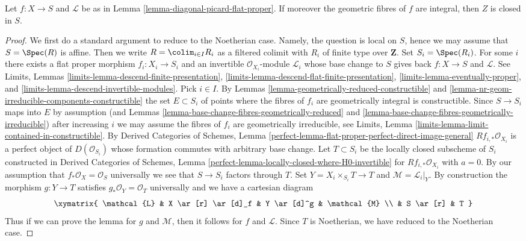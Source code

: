 \begin{lemma}
\label{lemma-get-a-closed}
Let $f : X \to S$ and $\mathcal{L}$ be as in
Lemma \ref{lemma-diagonal-picard-flat-proper}.
If moreover the geometric fibres of $f$ are
integral, then $Z$ is closed in $S$.
\end{lemma}

\begin{proof}
We first do a standard argument to reduce to the Noetherian case.
Namely, the question is local on $S$, hence we may assume that
$S = \Spec(R)$ is affine. Then we write $R = \colim_{i \in I} R_i$
as a filtered colimit with
$R_i$ of finite type over $\mathbf{Z}$. Set $S_i = \Spec(R_i)$.
For some $i$ there exists a flat proper morphism $f_i : X_i \to S_i$
and an invertible $\mathcal{O}_{X_i}$-module $\mathcal{L}_i$
whose base change to $S$ gives back $f : X \to S$ and $\mathcal{L}$.
See Limits, Lemmas \ref{limits-lemma-descend-finite-presentation},
\ref{limits-lemma-descend-flat-finite-presentation},
\ref{limits-lemma-eventually-proper}, and
\ref{limits-lemma-descend-invertible-modules}.
Pick $i \in I$.
By Lemmas \ref{lemma-geometrically-reduced-constructible} and
\ref{lemma-nr-geom-irreducible-components-constructible}
the set $E \subset S_i$ of points where the fibres of
$f_i$ are geometrically integral is constructible.
Since $S \to S_i$ maps into $E$ by assumption (and Lemmas
\ref{lemma-base-change-fibres-geometrically-reduced} and
\ref{lemma-base-change-fibres-geometrically-irreducible})
after increasing $i$ we may assume the fibres of $f_i$
are geometrically irreducible, see
Limits, Lemma \ref{limits-lemma-limit-contained-in-constructible}.
By Derived Categories of Schemes, Lemma
\ref{perfect-lemma-flat-proper-perfect-direct-image-general}
$Rf_{i, *}\mathcal{O}_{X_i}$ is a perfect object of
$D(\mathcal{O}_{S_i})$ whose formation commutes with arbitrary base change.
Let $T \subset S_i$ be the locally closed subscheme of $S_i$
constructed in Derived Categories of Schemes, Lemma
\ref{perfect-lemma-locally-closed-where-H0-invertible}
for $Rf_{i, *}\mathcal{O}_{X_i}$ with $a = 0$.
By our assumption that $f_*\mathcal{O}_X = \mathcal{O}_S$ universally
we see that $S \to S_i$ factors through $T$.
Set $Y = X_i \times_{S_i} T \to T$ and $\mathcal{M} = \mathcal{L}_i|_Y$.
By construction the morphism $g : Y \to T$ satisfies
$g_*\mathcal{O}_Y = \mathcal{O}_T$ universally
and we have a cartesian diagram
$$
\xymatrix{
\mathcal{L} & X \ar[r] \ar[d]_f & Y \ar[d]^g & \mathcal{M} \\
& S \ar[r] & T
}
$$
Thus if we can prove the lemma for $g$ and $\mathcal{M}$,
then it follows for $f$ and $\mathcal{L}$.
Since $T$ is Noetherian, we have reduced to the Noetherian case.


\end{proof}
